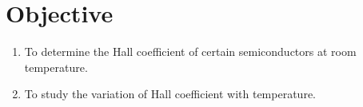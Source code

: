\section{Objective}

\begin{enumerate}
    \item To determine the Hall coefficient of certain semiconductors at room temperature.
    \item To study the variation of Hall coefficient with temperature.
\end{enumerate}
